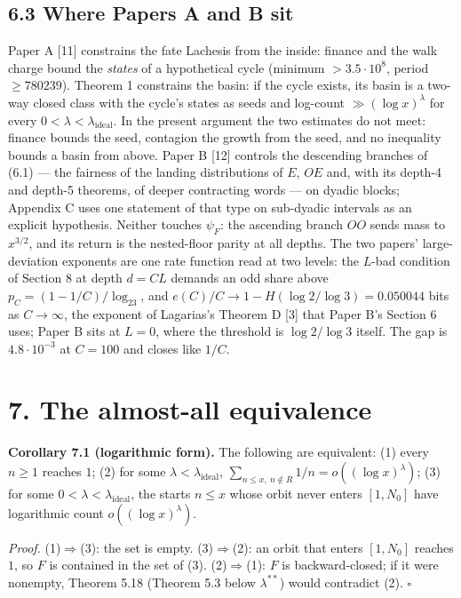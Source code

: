 \documentclass[11pt,a4paper]{article}
\begin{document}
\subsection{6.3 Where Papers A and B
sit}\label{where-papers-a-and-b-sit}

Paper A {[}11{]} constrains the fate Lachesis from the inside: finance
and the walk charge bound the \emph{states} of a hypothetical cycle
(minimum \(>3.5\cdot 10^8\), period \(\ge 780239\)). Theorem 1
constrains the basin: if the cycle exists, its basin is a two-way closed
class with the cycle's states as seeds and log-count
\(\gg(\log x)^\lambda\) for every
\(0<\lambda<\lambda_{\mathrm{ideal}}\). In the present argument the two
estimates do not meet: finance bounds the seed, contagion the growth
from the seed, and no inequality bounds a basin from above. Paper B
{[}12{]} controls the descending branches of (6.1) --- the fairness of
the landing distributions of \(E\), \(OE\) and, with its depth-4 and
depth-5 theorems, of deeper contracting words --- on dyadic blocks;
Appendix C uses one statement of that type on sub-dyadic intervals as an
explicit hypothesis. Neither touches \(\psi_F\): the ascending branch
\(OO\) sends mass to \(x^{3/2}\), and its return is the nested-floor
parity at all depths. The two papers' large-deviation exponents are one
rate function read at two levels: the \(L\)-bad condition of Section 8
at depth \(d=CL\) demands an odd share above \(p_C=(1-1/C)/\log_23\),
and \(e(C)/C\to1-H(\log2/\log3)=0.050044\) bits as \(C\to\infty\), the
exponent of Lagarias's Theorem D {[}3{]} that Paper B's Section 6 uses;
Paper B sits at \(L=0\), where the threshold is \(\log2/\log3\) itself.
The gap is \(4.8\cdot10^{-3}\) at \(C=100\) and closes like \(1/C\).

\section{7. The almost-all
equivalence}\label{the-almost-all-equivalence}

\textbf{Corollary 7.1 (logarithmic form).} The following are equivalent:
(1) every \(n\ge 1\) reaches \(1\); (2) for some
\(\lambda<\lambda_{\mathrm{ideal}}\),
\(\sum_{n\le x,\ n\notin R}1/n=o((\log x)^{\lambda})\); (3) for some
\(0<\lambda<\lambda_{\mathrm{ideal}}\), the starts \(n\le x\) whose
orbit never enters \([1,N_0]\) have logarithmic count
\(o((\log x)^{\lambda})\).

\emph{Proof.} (1)\(\Rightarrow\)(3): the set is empty.
(3)\(\Rightarrow\)(2): an orbit that enters \([1,N_0]\) reaches \(1\),
so \(F\) is contained in the set of (3). (2)\(\Rightarrow\)(1): \(F\) is
backward-closed; if it were nonempty, Theorem 5.18 (Theorem 5.3 below
\(\lambda^{**}\)) would contradict (2). \(\square\)
\end{document}
